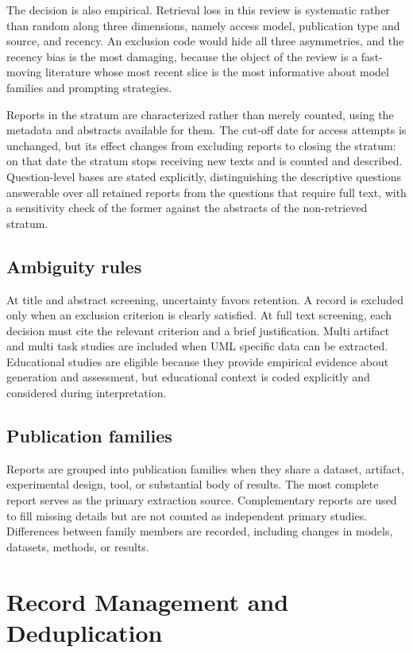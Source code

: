 The decision is also empirical. Retrieval loss in this review is systematic rather than random along three dimensions, namely access model, publication type and source, and recency. An exclusion code would hide all three asymmetries, and the recency bias is the most damaging, because the object of the review is a fast-moving literature whose most recent slice is the most informative about model families and prompting strategies.

Reports in the stratum are characterized rather than merely counted, using the metadata and abstracts available for them. The cut-off date for access attempts is unchanged, but its effect changes from excluding reports to closing the stratum: on that date the stratum stops receiving new texts and is counted and described. Question-level bases are stated explicitly, distinguishing the descriptive questions answerable over all retained reports from the questions that require full text, with a sensitivity check of the former against the abstracts of the non-retrieved stratum.

\subsection{Ambiguity rules}

At title and abstract screening, uncertainty favors retention. A record is excluded only when an exclusion criterion is clearly satisfied. At full text screening, each decision must cite the relevant criterion and a brief justification. Multi artifact and multi task studies are included when UML specific data can be extracted. Educational studies are eligible because they provide empirical evidence about generation and assessment, but educational context is coded explicitly and considered during interpretation.

\subsection{Publication families}

Reports are grouped into publication families when they share a dataset, artifact, experimental design, tool, or substantial body of results. The most complete report serves as the primary extraction source. Complementary reports are used to fill missing details but are not counted as independent primary studies. Differences between family members are recorded, including changes in models, datasets, methods, or results.

\section{Record Management and Deduplication}
\label{sec:protocol_records}

